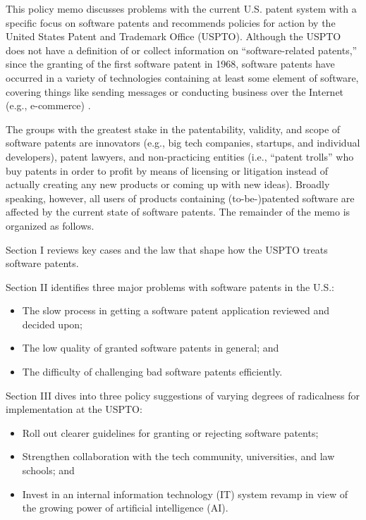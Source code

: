 \documentclass[12pt]{texMemo} %
\begin{document}
\maketitle

This policy memo discusses problems with the current U.S. patent system with a specific focus on software patents and recommends policies for action by the United States Patent and Trademark Office (USPTO). Although the USPTO does not have a definition of or collect information on “software-related patents,” since the granting of the first software patent \cite{goetz} in 1968, software patents have occurred in a variety of technologies containing at least some element of software, covering things like sending messages or conducting business over the Internet (e.g., e-commerce) \cite{rusco}.

The groups with the greatest stake in the patentability, validity, and scope of software patents are innovators (e.g., big tech companies, startups, and individual developers), patent lawyers, and non-practicing entities (i.e., “patent trolls” who buy patents in order to profit by means of licensing or litigation instead of actually creating any new products or coming up with new ideas). Broadly speaking, however, all users of products containing (to-be-)patented software are affected by the current state of software patents. The remainder of the memo is organized as follows.

Section I reviews key cases and the law that shape how the USPTO treats software patents.

Section II identifies three major problems with software patents in the U.S.:
\setlength{\parskip}{0pt} %
\begin{itemize}
    \item The slow process in getting a software patent application reviewed and decided upon;
    \item The low quality of granted software patents in general; and
    \item The difficulty of challenging bad software patents efficiently.
\end{itemize}
\setlength{\parskip}{0.5\baselineskip plus 2pt} %

Section III dives into three policy suggestions of varying degrees of radicalness for implementation at the USPTO:
\setlength{\parskip}{0pt} %
\begin{itemize}
    \item Roll out clearer guidelines for granting or rejecting software patents;
    \item Strengthen collaboration with the tech community, universities, and law schools; and
    \item Invest in an internal information technology (IT) system revamp in view of the growing power of artificial intelligence (AI).
\end{itemize}
\setlength{\parskip}{0.5\baselineskip plus 2pt} %
\end{document}
